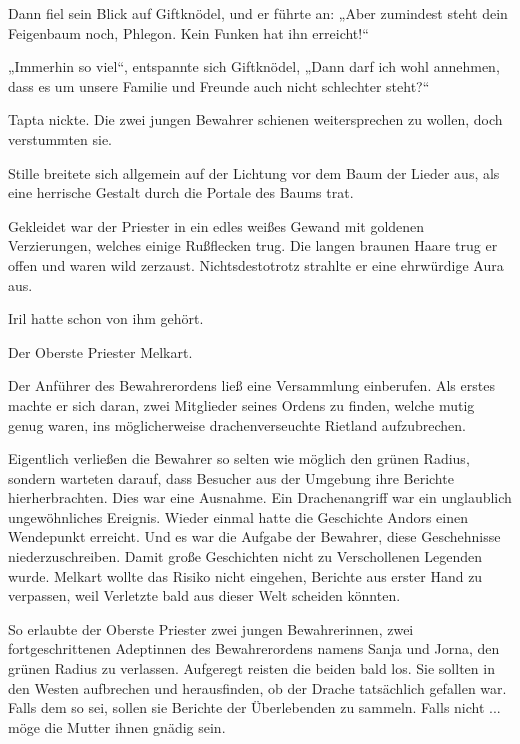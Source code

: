 Dann fiel sein Blick auf Giftknödel, und er führte an: „Aber zumindest steht dein Feigenbaum noch, Phlegon. Kein Funken hat ihn erreicht!“

„Immerhin so viel“, entspannte sich Giftknödel, „Dann darf ich wohl annehmen, dass es um unsere Familie und Freunde auch nicht schlechter steht?“

Tapta nickte. Die zwei jungen Bewahrer schienen weitersprechen zu wollen, doch verstummten sie.

Stille breitete sich allgemein auf der Lichtung vor dem Baum der Lieder aus, als eine herrische Gestalt durch die Portale des Baums trat.

Gekleidet war der Priester in ein edles weißes Gewand mit goldenen Verzierungen, welches einige Rußflecken trug. Die langen braunen Haare trug er offen und waren wild zerzaust. Nichtsdestotrotz strahlte er eine ehrwürdige Aura aus.

Iril hatte schon von ihm gehört.

Der Oberste Priester Melkart.

Der Anführer des Bewahrerordens ließ eine Versammlung einberufen. Als erstes machte er sich daran, zwei Mitglieder seines Ordens zu finden, welche mutig genug waren, ins möglicherweise drachenverseuchte Rietland aufzubrechen.

Eigentlich verließen die Bewahrer so selten wie möglich den grünen Radius, sondern warteten darauf, dass Besucher aus der Umgebung ihre Berichte hierherbrachten. Dies war eine Ausnahme. Ein Drachenangriff war ein unglaublich ungewöhnliches Ereignis. Wieder einmal hatte die Geschichte Andors einen Wendepunkt erreicht. Und es war die Aufgabe der Bewahrer, diese Geschehnisse niederzuschreiben. Damit große Geschichten nicht zu Verschollenen Legenden wurde. Melkart wollte das Risiko nicht eingehen, Berichte aus erster Hand zu verpassen, weil Verletzte bald aus dieser Welt scheiden könnten.

So erlaubte der Oberste Priester zwei jungen Bewahrerinnen, zwei fortgeschrittenen Adeptinnen des Bewahrerordens namens Sanja und Jorna, den grünen Radius zu verlassen. Aufgeregt reisten die beiden bald los. Sie sollten in den Westen aufbrechen und herausfinden, ob der Drache tatsächlich gefallen war. Falls dem so sei, sollen sie Berichte der Überlebenden zu sammeln. Falls nicht ... möge die Mutter ihnen gnädig sein.



\trennzeichen



